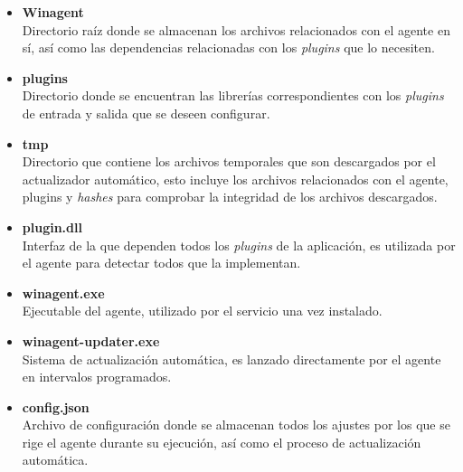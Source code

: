             \begin{itemize}
                \item \textbf{Winagent} \\
                    Directorio raíz donde se almacenan los archivos relacionados con el agente en sí, así como las dependencias relacionadas con los \textit{plugins} que lo necesiten.
                    
                \item \textbf{plugins} \\
                    Directorio donde se encuentran las librerías correspondientes con los \textit{plugins} de entrada y salida que se deseen configurar.
                    
                \item \textbf{tmp} \\
                    Directorio que contiene los archivos temporales que son descargados por el actualizador automático, esto incluye los archivos relacionados con el agente, plugins y \textit{hashes} para comprobar la integridad de los archivos descargados.
                    
                \item \textbf{plugin.dll} \\
                    Interfaz de la que dependen todos los \textit{plugins} de la aplicación, es utilizada por el agente para detectar todos  que la implementan.
                
                \item \textbf{winagent.exe} \\
                    Ejecutable del agente, utilizado por el servicio una vez instalado.
                
                \item \textbf{winagent-updater.exe} \\
                    Sistema de actualización automática, es lanzado directamente por el agente en intervalos programados.
                
                \item \textbf{config.json} \\
                    Archivo de configuración donde se almacenan todos los ajustes por los que se rige el agente durante su ejecución, así como el proceso de actualización automática.
                
            \end{itemize}
            
